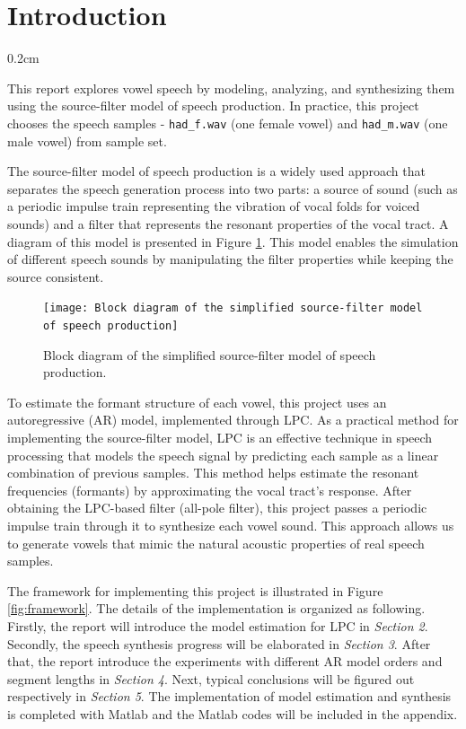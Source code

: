 \documentclass{article}
\newcommand{\setParDis}{\setlength {\parskip} {0.2cm} } %
\begin{document}

\section{Introduction}
\setParDis

This report explores vowel speech by modeling, analyzing, and synthesizing them using the source-filter model of speech production. In practice, this project chooses the speech samples - \verb+had_f.wav+ (one female vowel) and \verb+had_m.wav+ (one male vowel) from sample set. 

The source-filter model of speech production is a widely used approach that separates the speech generation process into two parts: a source of sound (such as a periodic impulse train representing the vibration of vocal folds for voiced sounds) and a filter that represents the resonant properties of the vocal tract\citep{kondoz2005digital}. A diagram of this model is presented in Figure \ref{fig:source-filter}. This model enables the simulation of different speech sounds by manipulating the filter properties while keeping the source consistent.

\begin{figure}[ht]
\begin{center}
\texttt{[image: Block diagram of the simplified source-filter model of speech production]}
\end{center}
\caption{\label{fig:source-filter} Block diagram of the simplified source-filter model of speech production\citep{kondoz2005digital}.}
\end{figure}

To estimate the formant structure of each vowel, this project uses an autoregressive (AR) model, implemented through LPC. As a practical method for implementing the source-filter model, LPC is an effective technique in speech processing that models the speech signal by predicting each sample as a linear combination of previous samples\citep{kondoz2005digital}. This method helps estimate the resonant frequencies (formants) by approximating the vocal tract’s response. After obtaining the LPC-based filter (all-pole filter), this project passes a periodic impulse train through it to synthesize each vowel sound. This approach allows us to generate vowels that mimic the natural acoustic properties of real speech samples.

The framework for implementing this project is illustrated in Figure \ref{fig:framework}. The details of the implementation is organized as following. Firstly, the report will introduce the model estimation for LPC in \textit{Section 2}. Secondly, the speech synthesis progress will be elaborated in \textit{Section 3}. After that, the report introduce the experiments with different AR model orders and segment lengths in \textit{Section 4}. Next, typical conclusions will be figured out respectively in \textit{Section 5}. The implementation of model estimation and synthesis is completed with Matlab and the Matlab codes will be included in the appendix.
\end{document}
